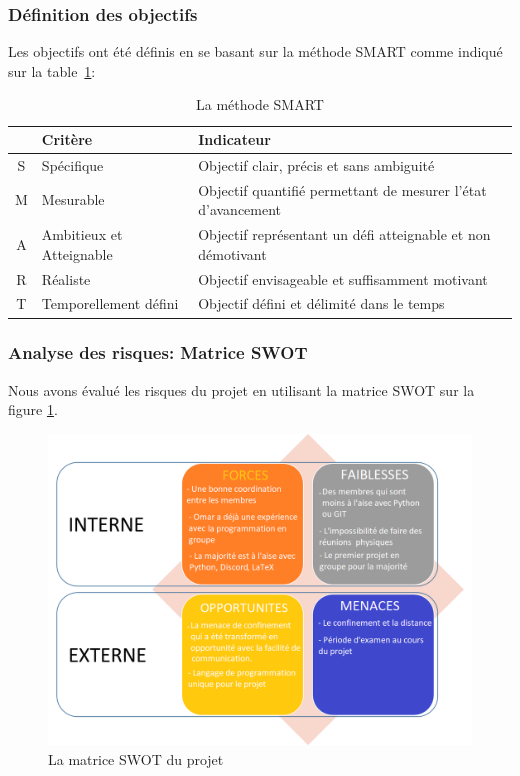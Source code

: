 \documentclass[12pt]{article}
\begin{document}
\subsubsection{Définition des objectifs}
Les objectifs ont été définis en se basant sur la méthode SMART comme indiqué sur la table~\ref{tab:SMART}: 
\begin{table} [!h]
 \begin{center}
 \begin{tabular}{|c||l|l|}
 \hline
  & Critère & Indicateur \\
 \hline
 S & Spécifique & Objectif clair, précis et sans ambiguité \\
 \hline
 M & Mesurable & Objectif quantifié permettant de mesurer l'état d'avancement \\
 \hline
 A & Ambitieux et Atteignable & Objectif représentant un défi atteignable et non démotivant \\
 \hline
 R & Réaliste & Objectif envisageable et suffisamment motivant \\
 \hline
 T & Temporellement défini & Objectif défini et délimité dans le temps \\
 \hline
 \end{tabular}
 \end{center}
 \caption{La méthode SMART}
 \label{tab:SMART}
 \end{table}


\subsubsection{Analyse des risques: Matrice SWOT}
Nous avons évalué les risques du projet en utilisant la matrice SWOT sur la figure \ref{fig:Matrice SWOT}.
        \begin{figure}[!h]
             \centering
             \includegraphics[scale = 0.5]{Images/Gestion de Projet/Matrice_swot.png}
             \caption{La matrice SWOT du projet}
             \label{fig:Matrice SWOT}
        \end{figure}
\end{document}
